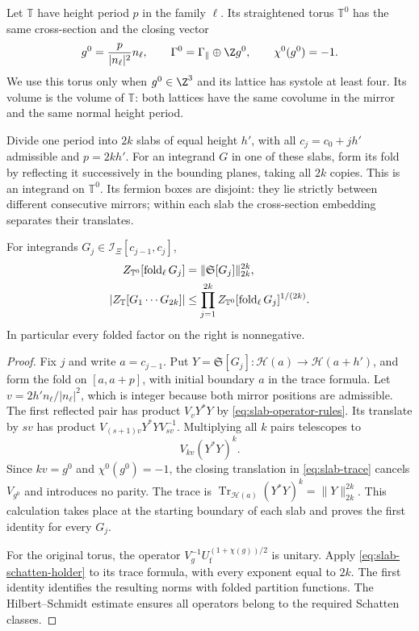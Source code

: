 Let $\mathbb T$ have height period $p$ in the family $\ell$. Its
straightened torus $\mathbb T^0$ has the same cross-section and the
closing vector
\begin{equation}\label{eq:slab-straight-vector}
 g^0=\frac p{|n_\ell|^2}n_\ell,
 \qquad \Gamma^0=\Gamma_\parallel\oplus\Z g^0,
 \qquad\chi^0(g^0)=-1.
\end{equation}
We use this torus only when $g^0\in\Z^3$ and its lattice has systole
at least four. Its volume is the volume of $\mathbb T$: both lattices
have the same covolume in the mirror and the same normal height period.

Divide one period into $2k$ slabs of equal height $h'$, with all
$c_j=c_0+jh'$ admissible and $p=2kh'$. For an integrand $G$ in one of
these slabs, form its fold by reflecting it successively in the
bounding planes, taking all $2k$ copies. This is an integrand on
$\mathbb T^0$. Its fermion boxes are disjoint: they lie strictly
between different consecutive mirrors; within each slab the
cross-section embedding separates their translates.

\begin{proposition}\label{prop:slab-fold-holder}
For integrands $G_j\in\mathcal I_\Xi[c_{j-1},c_j]$,
\begin{align}\label{eq:slab-fold-holder}
 Z_{\mathbb T^0}[\operatorname{fold}_\ell G_j]
              &=\|\mathfrak S[G_j]\|_{2k}^{2k},\notag\\
 |Z_{\mathbb T}[G_1\cdots G_{2k}]|
              &\le\prod_{j=1}^{2k}
               Z_{\mathbb T^0}[\operatorname{fold}_\ell G_j]^{1/(2k)}.
\end{align}
In particular every folded factor on the right is nonnegative.
\end{proposition}

\begin{proof}
Fix $j$ and write $a=c_{j-1}$. Put
$Y=\mathfrak S[G_j]:\mathcal H(a)\to\mathcal H(a+h')$, and form
the fold on $[a,a+p]$, with initial boundary $a$ in the trace formula.
Let
$v=2h'n_\ell/|n_\ell|^2$, which is integer because both mirror
positions are admissible. The first reflected pair has product
$V_vY^*Y$ by \eqref{eq:slab-operator-rules}. Its translate by $sv$
has product $V_{(s+1)v}Y^*YV_{sv}^{-1}$. Multiplying all $k$ pairs
telescopes to
\[
 V_{kv}(Y^*Y)^k.
\]
Since $kv=g^0$ and $\chi^0(g^0)=-1$, the closing translation in
\eqref{eq:slab-trace} cancels $V_{g^0}$ and introduces no parity.
The trace is
$\operatorname{Tr}_{\mathcal H(a)}(Y^*Y)^k=\|Y\|_{2k}^{2k}$.
This calculation takes place at the starting boundary of each slab
and proves the first identity for every $G_j$.

For the original torus, the operator
$V_g^{-1}U_{\mathrm f}^{(1+\chi(g))/2}$ is unitary. Apply
\eqref{eq:slab-schatten-holder} to its trace formula, with every
exponent equal to $2k$. The first identity identifies the resulting
norms with folded partition functions. The Hilbert--Schmidt estimate
ensures all operators belong to the required Schatten classes.
\end{proof}


